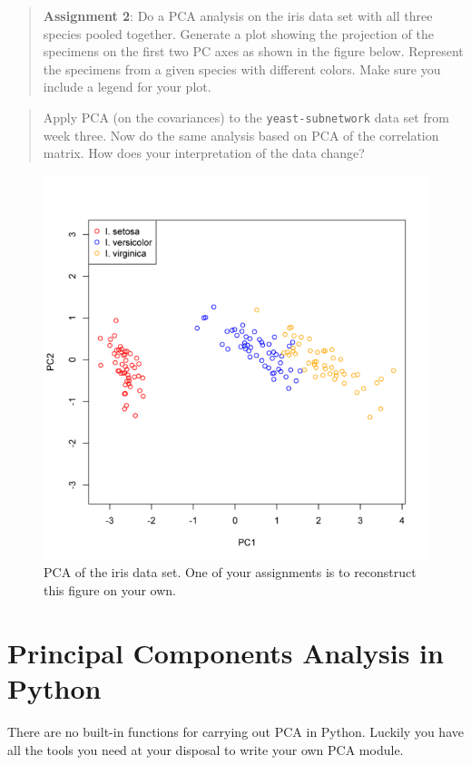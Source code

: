 \begin{quote}
\textbf{Assignment 2}: Do a PCA analysis on the iris data set with all
three species pooled together. Generate a plot showing the projection of
the specimens on the first two PC axes as shown in the figure below.
Represent the specimens from a given species with different colors. Make
sure you include a legend for your plot.

\end{quote}
\begin{quote}
Apply PCA (on the covariances) to the \lstinline!yeast-subnetwork! data
set from week three. Now do the same analysis based on PCA of the
correlation matrix. How does your interpretation of the data change?

\end{quote}
\begin{figure}[htbp]
\centering
\includegraphics{iris-all-pca.png}
\caption{PCA of the iris data set. One of your assignments is to
reconstruct this figure on your own.}
\end{figure}

\section{Principal Components Analysis in Python}

There are no built-in functions for carrying out PCA in Python. Luckily
you have all the tools you need at your disposal to write your own PCA
module.


